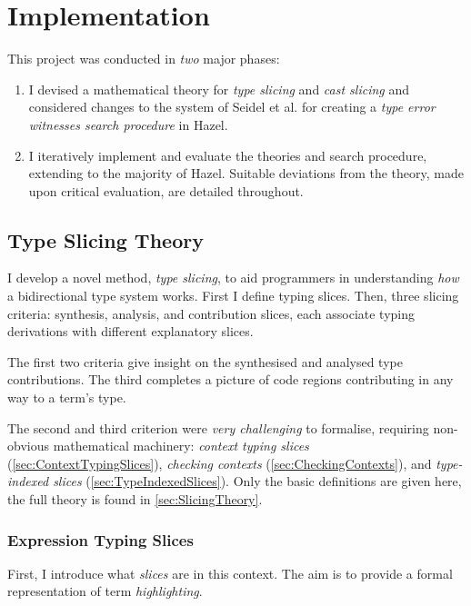\chapter{Implementation}\label{chap:Implementation}
This project was conducted in \textit{two} major phases:
\begin{enumerate}
\item I devised a mathematical theory for \textit{type slicing} and \textit{cast slicing} and considered changes to the system of Seidel et al. \cite{SearchProc} for creating a \textit{type error witnesses search procedure} in Hazel.  

\item I iteratively implement and evaluate the theories and search procedure, extending to the majority of Hazel. Suitable deviations from the theory, made upon critical evaluation, are detailed throughout.
\end{enumerate}

\section{Type Slicing Theory}\label{sec:TypeSlicingTheory}

I develop a novel method, \textit{type slicing}, to aid programmers in understanding \textit{how} a bidirectional type system works. First I define typing slices. Then, three slicing criteria: synthesis, analysis, and contribution slices, each associate typing derivations with different explanatory slices. 

The first two criteria give insight on the synthesised and analysed type contributions. The third completes a picture of code regions contributing in any way to a term's type.

The second and third criterion were \textit{very challenging} to formalise, requiring non-obvious mathematical machinery: \textit{context typing slices} (\cref{sec:ContextTypingSlices}), \textit{checking contexts} (\cref{sec:CheckingContexts}), and \textit{type-indexed slices} (\cref{sec:TypeIndexedSlices}). Only the basic definitions are given here, the full theory is found in \cref{sec:SlicingTheory}.

\subsection{Expression Typing Slices}\label{sec:ExpressionTypingSlices}
First, I introduce what \textit{slices} are in this context. The aim is to provide a formal representation of term \textit{highlighting}. 

